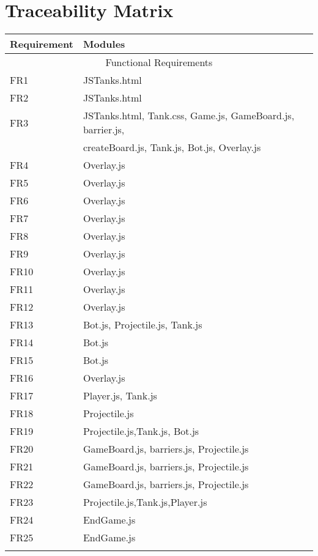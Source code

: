 \documentclass{article}
\begin{document}
\section{Traceability Matrix}
\begin{table}[H]
      \begin{tabular}{ll}
        \toprule
        Requirement & Modules \\
        \midrule
        \multicolumn{2}{c}{Functional Requirements} \\
        \midrule
        FR1 & JSTanks.html \\
        FR2 & JSTanks.html \\
        FR3 & JSTanks.html, Tank.css, Game.js, GameBoard.js, barrier.js, \\
                 & createBoard.js, Tank.js, Bot.js, Overlay.js \\
        FR4 & Overlay.js \\
        FR5 & Overlay.js \\
        FR6 & Overlay.js \\
        FR7 & Overlay.js\\
        FR8 & Overlay.js \\
        FR9 & Overlay.js \\
        FR10 & Overlay.js \\
        FR11 & Overlay.js \\
        FR12 & Overlay.js \\
        FR13 & Bot.js, Projectile.js, Tank.js \\
        FR14 & Bot.js \\
        FR15 & Bot.js \\
        FR16 & Overlay.js \\
        FR17 & Player.js, Tank.js \\
        FR18 & Projectile.js \\
        FR19 & Projectile.js,Tank.js, Bot.js\\
        FR20 & GameBoard.js, barriers.js, Projectile.js\\
        FR21 & GameBoard.js, barriers.js, Projectile.js \\
        FR22 & GameBoard.js, barriers.js, Projectile.js \\
        FR23 & Projectile.js,Tank.js,Player.js  \\
        FR24 & EndGame.js \\
        FR25 & EndGame.js \\ \\

\end{tabular}
\end{table}
\end{document}

